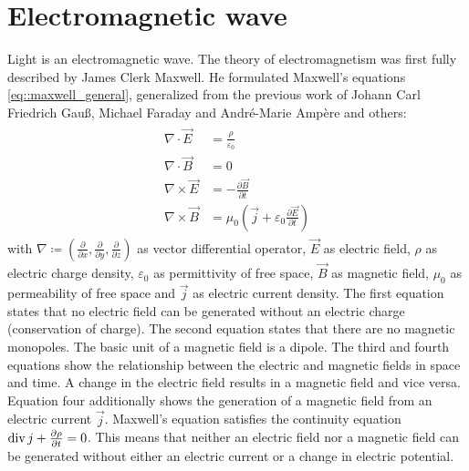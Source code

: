 \section{Electromagnetic wave}
%
Light is an electromagnetic wave.
The theory of electromagnetism was first fully described by James Clerk Maxwell.
He formulated Maxwell's equations \cref{eq::maxwell_general}, generalized from the previous work of Johann Carl Friedrich Gau{\ss}, Michael Faraday and Andr\'{e}-Marie Amp\`{e}re and others:
%
\begin{align}
\begin{split} \label{eq::maxwell_general}
    \nabla \cdot \vec{E} &= \frac {\rho} {\varepsilon_0}\\
    \nabla \cdot \vec{B} &= 0\\
    \nabla \times \vec{E} &= -\frac{\partial \vec{B}} {\partial t}\\
    \nabla \times \vec{B} &= \mu_0 \left( \vec{j} + \varepsilon_0 \frac{\partial \vec{E}} {\partial t} \right)
\end{split}
\end{align}
%
with $\nabla \coloneqq \left({\frac{\partial}{\partial x}}, {\frac{\partial}{\partial y}}, {\frac{\partial}{\partial z}} \right)$ as vector differential operator, $\vec{E}$ as electric field, $\rho$ as electric charge density, $\varepsilon_0$ as permittivity of free space, $\vec{B}$ as magnetic field, $\mu_0$ as permeability of free space and $\vec{j}$ as electric current density.
%
The first equation states that no electric field can be generated without an electric charge (conservation of charge).
The second equation states that there are no magnetic monopoles.
The basic unit of a magnetic field is a dipole.
The third and fourth equations show the relationship between the electric and magnetic fields in space and time.
A change in the electric field results in a magnetic field and vice versa.
Equation four additionally shows the generation of a magnetic field from an electric current $\vec{j}$.
Maxwell's equation satisfies the continuity equation $\operatorname{div} j + \frac{\partial \rho}{\partial t} = 0$.
This means that neither an electric field nor a magnetic field can be generated without either an electric current or a change in electric potential.
%
%
